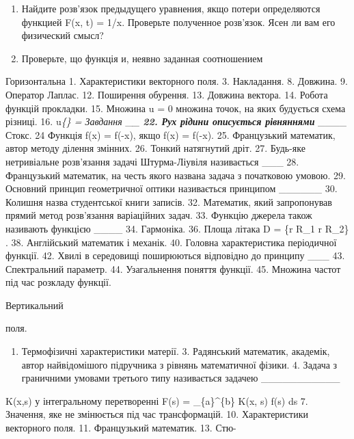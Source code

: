 \documentclass[
  ukrainian,
]{article}
\providecommand{\tightlist}{%
  \setlength{\itemsep}{0pt}\setlength{\parskip}{0pt}}
\begin{document}
\begin{enumerate}
\def\labelenumi{\arabic{enumi}.}
\setcounter{enumi}{3}
\item
  Найдите розв'язок предыдущего уравнения, якщо потери определяются
  функцией F(x, t) = 1/x. Проверьте полученное розв'язок. Ясен ли вам
  его физический смысл?
\item
  Проверьте, що функція и, неявно заданная соотношением
\end{enumerate}

Горизонтальна 1. Характеристики векторного поля. 3. Накладання. 8.
Довжина. 9. Оператор Лаплас. 12. Поширення обурення. 13. Довжина
вектора. 14. Робота функцій прокладки. 15. Множина \int \Delta u = 0
множина точок, на яких будується схема різниці. 16.
\textbar u\textbar{}\emph{\{\Gamma\} = \varphi Завдання
}\_\emph{\_\textbf{ 22. Рух рідини описується рівняннями }}\_\_\_\_
Стокс. 24 Функція f(x) = f(-x), якщо f(x) = f(-x). 25. Французький
математик, автор методу ділення змінних. 26. Тонкий натягнутий дріт. 27.
Будь-яке нетривіальне розв'язання задачі Штурма-Ліувіля називається
\_\_\_ 28. Французький математик, на честь якого названа задача з
початковою умовою. 29. Основний принцип геометричної оптики називається
принципом \_\_\_\_\_\_ 30. Колишня назва студентської книги записів. 32.
Математик, який запропонував прямий метод розв'язання варіаційних задач.
33. Функцію джерела також називають функцією \_\_\_\_ 34. Гармоніка. 36.
Площа літака D = \{r \colon R\_1 \leqslant r \leqslant R\_2\} . 38.
Англійський математик і механік. 40. Головна характеристика періодичної
функції. 42. Хвилі в середовищі поширюються відповідно до принципу
\_\_\_ 43. Спектральний параметр. 44. Узагальнення поняття функції. 45.
Множина частот під час розкладу функції.

Вертикальний

поля.

\begin{enumerate}
\def\labelenumi{\arabic{enumi}.}
\setcounter{enumi}{1}
\tightlist
\item
  Термофізичні характеристики матерії. 3. Радянський математик,
  академік, автор найвідомішого підручника з рівнянь математичної
  фізики. 4. Задача з граничними умовами третього типу називається
  задачею \_\_\_\_\_\_\_\_\_\_\_
\end{enumerate}

K(x,s) у інтегральному перетворенні F(s) = \int\_\{a\}\^{}\{b\} K(x, s)
f(s) ds 7. Значення, яке не змінюється під час трансформацій. 10.
Характеристики векторного поля. 11. Французький математик. 13. Стю-
\end{document}
